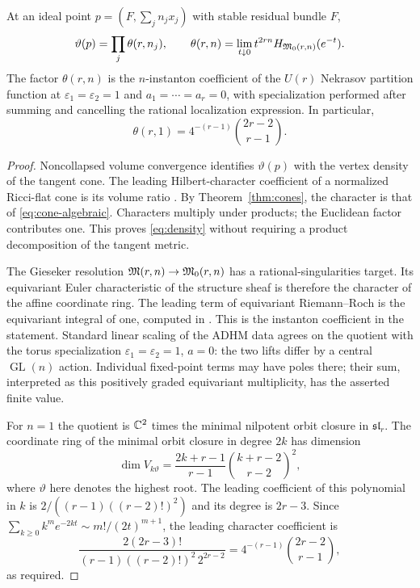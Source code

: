 \begin{theorem}\label{thm:density}
At an ideal point $p=(F,\sum_jn_jx_j)$ with stable residual bundle $F$,
\begin{equation}\label{eq:density}
 \vartheta(p)=\prod_j\theta(r,n_j),\qquad
 \theta(r,n)=\lim_{t\downarrow0}t^{2rn}
                    H_{\mathfrak M_0(r,n)}(e^{-t}).
\end{equation}
The factor $\theta(r,n)$ is the $n$-instanton coefficient of the
$U(r)$ Nekrasov partition function at
$\varepsilon_1=\varepsilon_2=1$ and $a_1=\cdots=a_r=0$, with
specialization performed after summing and cancelling the rational
localization expression. In particular,
\begin{equation}\label{eq:one-instanton}
 \theta(r,1)=4^{-(r-1)}\binom{2r-2}{r-1}.
\end{equation}
\end{theorem}
\begin{proof}
Noncollapsed volume convergence identifies $\vartheta(p)$ with the vertex
density of the tangent cone. The leading Hilbert-character coefficient of
a normalized Ricci-flat cone is its volume ratio
\cite[Appendix~C]{HeinSun17}. By Theorem~\ref{thm:cones}, the character is
that of \eqref{eq:cone-algebraic}. Characters multiply under products;
the Euclidean factor contributes one. This proves \eqref{eq:density}
without requiring a product decomposition of the tangent metric.

The Gieseker resolution
$\mathfrak M(r,n)\to\mathfrak M_0(r,n)$ has a rational-singularities target. Its
equivariant Euler characteristic of the structure sheaf is therefore the
character of the affine coordinate ring. The leading term of equivariant
Riemann--Roch is the equivariant integral of one, computed in
\cite[Proposition~4.1 and (4.6)]{NY05}. This is the instanton coefficient
in the statement. Standard linear scaling of the ADHM data agrees on the
quotient with the torus specialization
$\varepsilon_1=\varepsilon_2=1$, $a=0$: the two lifts differ by a central
$\operatorname{GL}(n)$ action. Individual fixed-point terms may have poles
there; their sum, interpreted as this positively graded equivariant
multiplicity, has the asserted finite value.

For $n=1$ the quotient is $\mathbb C^2$ times the minimal nilpotent orbit closure
in $\mathfrak{sl}_r$. The coordinate ring of the minimal orbit closure in degree $2k$ has dimension
\[
 \dim V_{k\vartheta}=\frac{2k+r-1}{r-1}
                         \binom{k+r-2}{r-2}^2,
\]
where $\vartheta$ here denotes the highest root.
The leading coefficient of this polynomial in $k$ is
$2/((r-1)((r-2)!)^2)$ and its degree is $2r-3$.
Since $\sum_{k\ge0}k^m e^{-2kt}\sim m!/(2t)^{m+1}$, the leading
character coefficient is
\[
 \frac{2(2r-3)!}{(r-1)((r-2)!)^2\,2^{2r-2}}
 =4^{-(r-1)}\binom{2r-2}{r-1},
\]
as required.
\end{proof}

